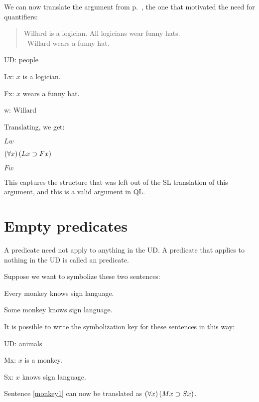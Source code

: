 We can now translate the argument from p.~\pageref{willard1}, the one that motivated the need for quantifiers:
\begin{quote}
Willard is a logician. All logicians wear funny hats.\\
\therefore\ Willard wears a funny hat.
\end{quote}
\begin{ekey}
\item[UD:] people
\item[Lx:] $x$ is a logician.
\item[Fx:] $x$ wears a funny hat.
\item[w:] Willard
\end{ekey}
Translating, we get:
\begin{earg}
\item[] $Lw$
\item[] $(\forall x) \,(Lx \supset Fx)$
\item[\therefore] $Fw$
\end{earg}

This captures the structure that was left out of the SL translation of this argument, and this is a valid argument in QL.








\section{Empty predicates}
A predicate need not apply to anything in the UD. A predicate that applies to nothing in the UD is called an  predicate.

Suppose we want to symbolize these two sentences:
\begin{earg}
\item[\ex{monkey1}]Every monkey knows sign language.
\item[\ex{monkey2}]Some monkey knows sign language.
\end{earg}
It is possible to write the symbolization key for these sentences in this way:
\begin{ekey}
\item[UD:] animals
\item[Mx:] $x$ is a monkey.
\item[Sx:] $x$ knows sign language.
\end{ekey}

Sentence \ref{monkey1} can now be translated as $(\forall x) \,(Mx \supset Sx)$.

